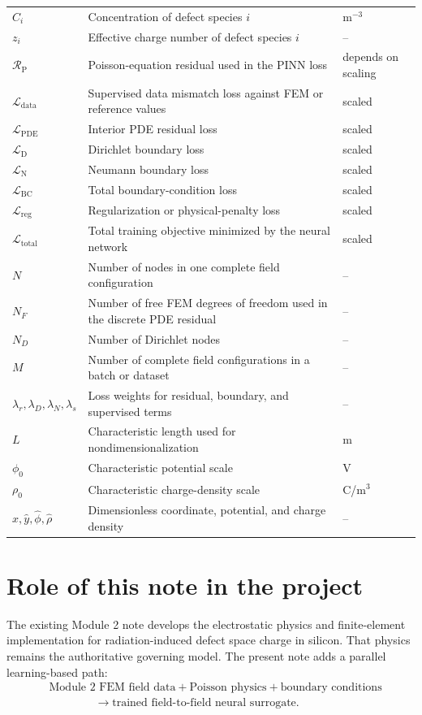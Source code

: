 \documentclass[11pt]{article}
\newcommand{\Rpoisson}{\mathcal{R}_{\mathrm{P}}}
\newcommand{\Ldata}{\mathcal{L}_{\mathrm{data}}}
\newcommand{\Lpde}{\mathcal{L}_{\mathrm{PDE}}}
\newcommand{\Lbc}{\mathcal{L}_{\mathrm{BC}}}
\newcommand{\Ldir}{\mathcal{L}_{\mathrm{D}}}
\newcommand{\Lneu}{\mathcal{L}_{\mathrm{N}}}
\newcommand{\Lreg}{\mathcal{L}_{\mathrm{reg}}}
\newcommand{\Ltot}{\mathcal{L}_{\mathrm{total}}}
\begin{document}
\begin{longtable}{p{} p{} p{}}
$C_i$ & Concentration of defect species $i$ & m$^{-3}$ \\
$z_i$ & Effective charge number of defect species $i$ & -- \\
$\Rpoisson$ & Poisson-equation residual used in the PINN loss & depends on scaling \\
$\Ldata$ & Supervised data mismatch loss against FEM or reference values & scaled \\
$\Lpde$ & Interior PDE residual loss & scaled \\
$\Ldir$ & Dirichlet boundary loss & scaled \\
$\Lneu$ & Neumann boundary loss & scaled \\
$\Lbc$ & Total boundary-condition loss & scaled \\
$\Lreg$ & Regularization or physical-penalty loss & scaled \\
$\Ltot$ & Total training objective minimized by the neural network & scaled \\
$N$ & Number of nodes in one complete field configuration & -- \\
$N_F$ & Number of free FEM degrees of freedom used in the discrete PDE residual & -- \\
$N_D$ & Number of Dirichlet nodes & -- \\
$M$ & Number of complete field configurations in a batch or dataset & -- \\
$\lambda_r,\lambda_D,\lambda_N,\lambda_s$ & Loss weights for residual, boundary, and supervised terms & -- \\
$L$ & Characteristic length used for nondimensionalization & m \\
$\phi_0$ & Characteristic potential scale & V \\
$\rho_0$ & Characteristic charge-density scale & C/m$^3$ \\
$\hat{x},\hat{y},\hat{\phi},\hat{\rho}$ & Dimensionless coordinate, potential, and charge density & -- \\
\bottomrule
\end{longtable}

\section{Role of this note in the project}

The existing Module 2 note develops the electrostatic physics and finite-element implementation for radiation-induced defect space charge in silicon. That physics remains the authoritative governing model. The present note adds a parallel learning-based path:
\begin{equation}
\begin{aligned}
&\text{Module 2 FEM field data}+\text{Poisson physics}+\text{boundary conditions}\\
&\hspace{4em}\longrightarrow \text{trained field-to-field neural surrogate}.
\end{aligned}
\end{equation}
\end{document}

